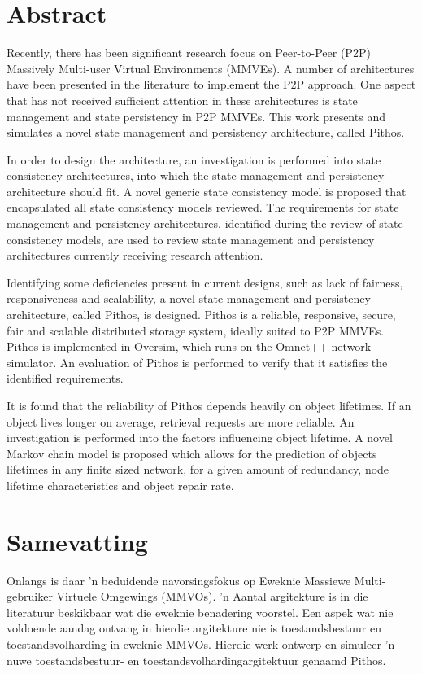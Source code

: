
\chapter*{Abstract}
Recently, there has been significant research focus on Peer-to-Peer (P2P) Massively Multi-user Virtual Environments (MMVEs). A number of architectures have been presented in the literature to implement the P2P approach. One aspect that has not received sufficient attention in these architectures is state management and state persistency in P2P MMVEs. This work presents and simulates a novel state management and persistency architecture, called Pithos.

In order to design the architecture, an investigation is performed into state consistency architectures, into which the state management and persistency architecture should fit. A novel generic state consistency model is proposed that encapsulated all state consistency models reviewed. The requirements for state management and persistency architectures, identified during the review of state consistency models, are used to review state management and persistency architectures currently receiving research attention.

Identifying some deficiencies present in current designs, such as lack of fairness, responsiveness and scalability, a novel state management and persistency architecture, called Pithos, is designed. Pithos is a reliable, responsive, secure, fair and scalable distributed storage system, ideally suited to P2P MMVEs. Pithos is implemented in Oversim, which runs on the Omnet++ network simulator. An evaluation of Pithos is performed to verify that it satisfies the identified requirements.

It is found that the reliability of Pithos depends heavily on object lifetimes. If an object lives longer on average, retrieval requests are more reliable. An investigation is performed into the factors influencing object lifetime. A novel Markov chain model is proposed which allows for the prediction of objects lifetimes in any finite sized network, for a given amount of redundancy, node lifetime characteristics and object repair rate.

\chapter*{Samevatting}

Onlangs is daar 'n beduidende navorsingsfokus op Eweknie Massiewe Multi-gebruiker Virtuele Omgewings (MMVOs). 'n Aantal argitekture is in die literatuur beskikbaar wat die eweknie benadering voorstel. Een aspek wat nie voldoende aandag ontvang in hierdie argitekture nie is toestandsbestuur en toestandsvolharding in eweknie MMVOs. Hierdie werk ontwerp en simuleer 'n nuwe toestandsbestuur- en toestandsvolhardingargitektuur genaamd Pithos.

